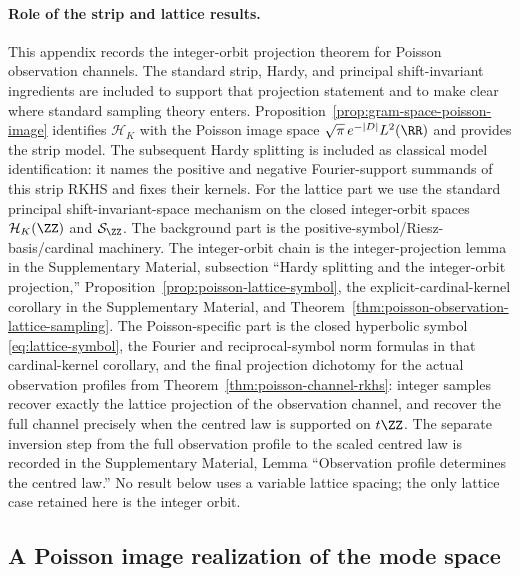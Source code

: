 \paragraph{Role of the strip and lattice results.}
This appendix records the integer-orbit projection theorem for Poisson
observation channels.  The standard strip, Hardy, and principal
shift-invariant ingredients are included to support that projection statement
and to make clear where standard sampling theory enters.
Proposition~\ref{prop:gram-space-poisson-image}
identifies $\mathcal H_K$ with the Poisson image space
$\sqrt{\pi}\,e^{-|D|}L^2(\RR)$ and provides the strip model.  The subsequent
Hardy splitting is included as classical model identification: it names the
positive and negative Fourier-support summands of this strip RKHS and fixes
their kernels.  For the lattice part we use the standard principal
shift-invariant-space mechanism on the closed integer-orbit spaces
$\mathcal H_K(\ZZ)$ and $\mathcal S_{\ZZ}$.
The background part is the positive-symbol/Riesz-basis/cardinal machinery.  The
integer-orbit chain is the integer-projection lemma in the Supplementary
Material, subsection ``Hardy splitting and the integer-orbit projection,''
Proposition~\ref{prop:poisson-lattice-symbol}, the explicit-cardinal-kernel
corollary in the Supplementary Material, and
Theorem~\ref{thm:poisson-observation-lattice-sampling}.  The
Poisson-specific part is the closed hyperbolic symbol
\eqref{eq:lattice-symbol}, the Fourier and reciprocal-symbol norm formulas in
that cardinal-kernel corollary, and the final projection dichotomy for the
actual observation profiles from Theorem~\ref{thm:poisson-channel-rkhs}:
integer samples recover exactly the lattice projection of the observation
channel, and recover the full channel precisely when the centred law is
supported on \(t\ZZ\).  The separate inversion step from the full observation
profile to the scaled centred law is recorded in the Supplementary Material,
Lemma ``Observation profile
determines the centred law.''  No result below uses a
variable lattice spacing; the only lattice case retained here is the integer
orbit.

\subsection{A Poisson image realization of the mode space}

